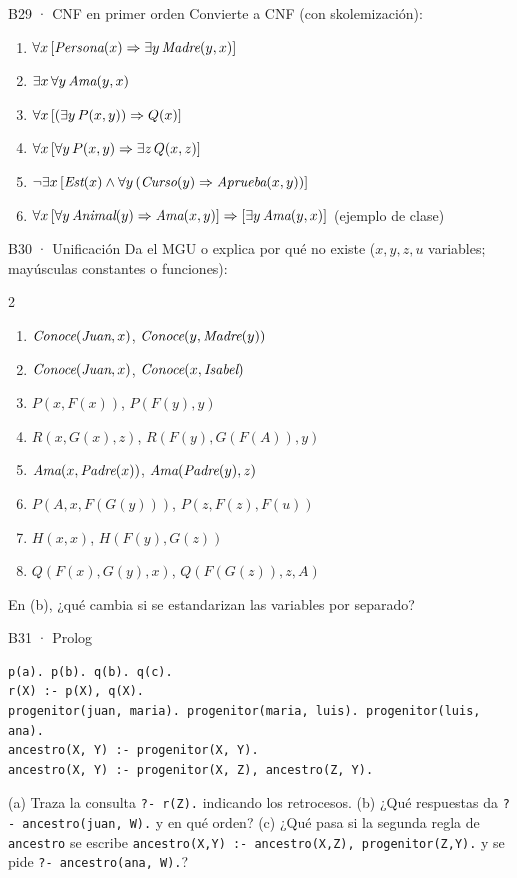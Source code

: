 \begin{ejercicio}{B29 · CNF en primer orden }
Convierte a CNF (con skolemización):
\begin{enumerate}[label=(\alph*)]
\item $\forall x\,[\textit{Persona}(x)\Rightarrow\exists y\,\textit{Madre}(y,x)]$
\item $\exists x\,\forall y\,\textit{Ama}(y,x)$
\item $\forall x\,[(\exists y\,P(x,y))\Rightarrow Q(x)]$
\item $\forall x\,[\forall y\,P(x,y)\Rightarrow\exists z\,Q(x,z)]$
\item $\neg\exists x\,[\textit{Est}(x)\wedge\forall y\,(\textit{Curso}(y)\Rightarrow\textit{Aprueba}(x,y))]$
\item $\forall x\,[\forall y\,\textit{Animal}(y)\Rightarrow\textit{Ama}(x,y)]\Rightarrow[\exists y\,\textit{Ama}(y,x)]$ (ejemplo de clase)
\end{enumerate}
\end{ejercicio}

\begin{ejercicio}{B30 · Unificación }
Da el MGU o explica por qué no existe ($x,y,z,u$ variables; mayúsculas constantes o funciones):
\begin{multicols}{2}
\begin{enumerate}[label=(\alph*)]
\item $\textit{Conoce}(\textit{Juan},x)$, $\textit{Conoce}(y,\textit{Madre}(y))$
\item $\textit{Conoce}(\textit{Juan},x)$, $\textit{Conoce}(x,\textit{Isabel})$
\item $P(x,F(x))$, $P(F(y),y)$
\item $R(x,G(x),z)$, $R(F(y),G(F(A)),y)$
\item $\textit{Ama}(x,\textit{Padre}(x))$, $\textit{Ama}(\textit{Padre}(y),z)$
\item $P(A,x,F(G(y)))$, $P(z,F(z),F(u))$
\item $H(x,x)$, $H(F(y),G(z))$
\item $Q(F(x),G(y),x)$, $Q(F(G(z)),z,A)$
\end{enumerate}
\end{multicols}
En (b), ¿qué cambia si se estandarizan las variables por separado?
\end{ejercicio}

\begin{ejercicio}{B31 · Prolog }
\begin{lstlisting}
p(a). p(b). q(b). q(c).
r(X) :- p(X), q(X).
progenitor(juan, maria). progenitor(maria, luis). progenitor(luis, ana).
ancestro(X, Y) :- progenitor(X, Y).
ancestro(X, Y) :- progenitor(X, Z), ancestro(Z, Y).
\end{lstlisting}
(a) Traza la consulta \texttt{?- r(Z).} indicando los retrocesos. (b) ¿Qué respuestas da
\texttt{?- ancestro(juan, W).} y en qué orden? (c) ¿Qué pasa si la segunda regla de \texttt{ancestro}
se escribe \texttt{ancestro(X,Y) :- ancestro(X,Z), progenitor(Z,Y).} y se pide
\texttt{?- ancestro(ana, W).}?
\end{ejercicio}

